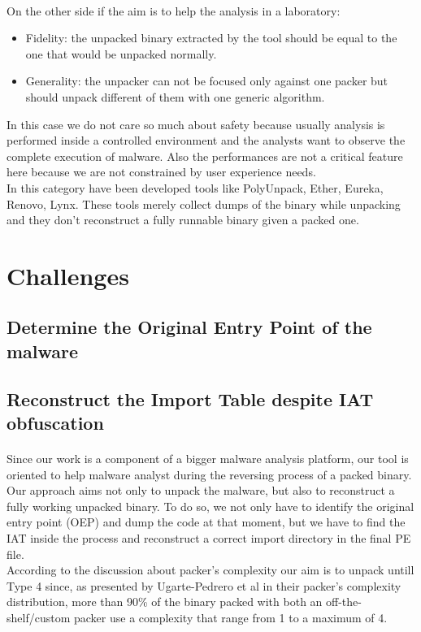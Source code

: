 \paragraph{}
On the other side if the aim is to help the analysis in a laboratory:
\begin{itemize}
\item Fidelity: the unpacked binary extracted by the tool should be equal to the one that would be unpacked normally. 
\item Generality: the unpacker can not be focused only against one packer but should unpack different of them with one generic algorithm.
\end{itemize}
In this case we do not care so much about safety because usually analysis is performed inside a controlled environment and the analysts want to observe the complete execution of malware. Also the performances are not a critical feature here because we are not constrained by user experience needs.\\
In this category have been developed tools like PolyUnpack, Ether, Eureka, Renovo, Lynx.
These tools merely collect dumps of the binary while unpacking and they don't reconstruct a fully runnable binary given a packed one.


\section{Challenges}
\subsection{Determine the Original Entry Point of the malware}

\subsection{Reconstruct the Import Table despite IAT obfuscation}

\paragraph{}
Since our work is a component of a bigger malware analysis platform\cite{jackdaw}, our tool is oriented to help malware analyst during the reversing process of a packed binary. 
Our approach aims not only to unpack the malware, but also to reconstruct a fully working unpacked binary. To do so, we not only have to identify the original entry point (OEP) and dump the code at that moment, but we have to find the IAT inside the process and reconstruct a correct import directory in the final PE file.\\
According to the discussion about packer's complexity our aim is to unpack untill Type 4 since, as presented by Ugarte-Pedrero et al\cite{sokpacker} in their packer's complexity distribution, more than 90\% of the binary packed with both an off-the-shelf/custom packer use a complexity that range from 1 to a maximum of 4.
